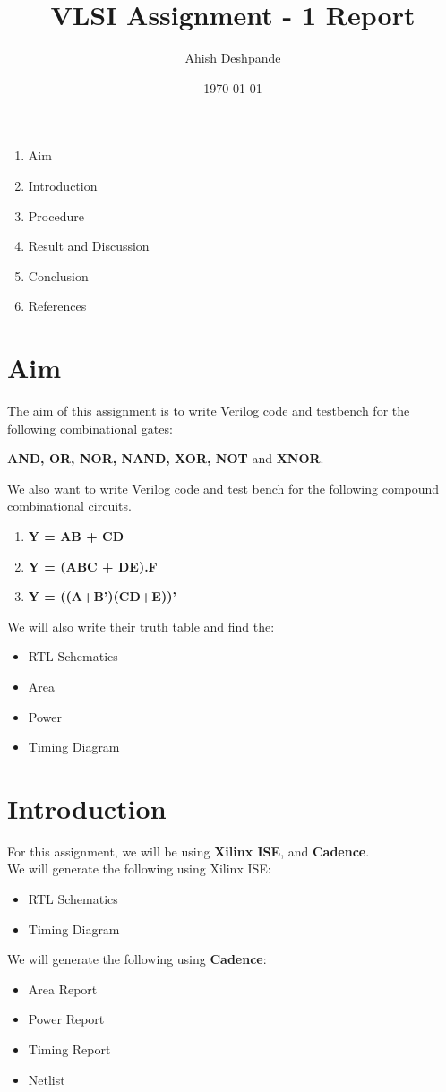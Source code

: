 \documentclass[a4paper,11pt]{report}
\begin{document}
\title{VLSI Assignment - 1 Report}
\author{Ahish Deshpande}
\date{\today}
\maketitle


\tableofcontents
\begin{enumerate}

\item Aim
\item Introduction
\item Procedure
\item Result and Discussion
\item Conclusion
\item References

\end{enumerate}
\newpage

\renewcommand\thesection{\arabic{section}}
\section{Aim}
The aim of this assignment is to write Verilog code and testbench for the following combinational gates:
  \begin{center}\textbf{AND, OR, NOR, NAND, XOR, NOT} and \textbf{XNOR}. \end{center} 
We also want to write Verilog code and test bench for the following compound combinational circuits.
\begin{enumerate}
\item \textbf{Y = AB + CD}
\item \textbf{Y = (ABC + DE).F}
\item \textbf{Y = ((A+B')(CD+E))'}
\end{enumerate} 
We will also write their truth table and find the: 
\begin{itemize}
\item RTL Schematics
\item Area
\item Power
\item Timing Diagram
\end{itemize}

\section{Introduction}
For this assignment, we will be using \textbf{Xilinx ISE}, and \textbf{Cadence}.
\\ We will generate the following using Xilinx ISE:
\begin{itemize}
\item RTL Schematics
\item Timing Diagram
\end{itemize}
 We will generate the following using \textbf{Cadence}:
\begin{itemize}
\item Area Report
\item Power Report
\item Timing Report
\item Netlist
\end{itemize}
\end{document}
